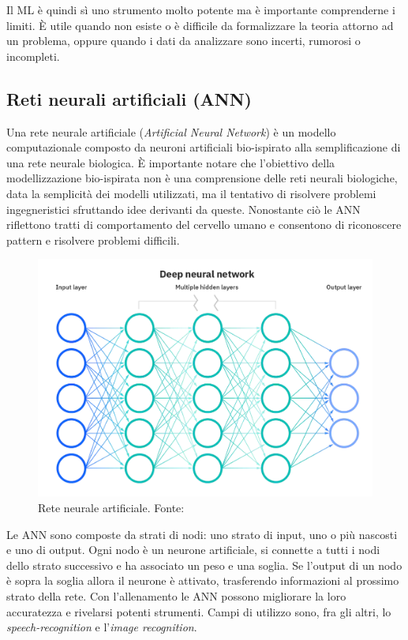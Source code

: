 Il ML è quindi sì uno strumento molto potente ma è importante comprenderne i limiti. È utile quando non esiste o è difficile da formalizzare la teoria attorno ad un problema, oppure quando i dati da analizzare sono incerti, rumorosi o incompleti.

\subsection{Reti neurali artificiali (ANN)}

Una rete neurale artificiale (\textit{Artificial Neural Network}) è un modello computazionale composto da neuroni artificiali bio-ispirato alla semplificazione di una rete neurale biologica. È importante notare che l'obiettivo della modellizzazione bio-ispirata non è una comprensione delle reti neurali biologiche, data la semplicità dei modelli utilizzati, ma il tentativo di risolvere problemi ingegneristici sfruttando idee derivanti da queste. Nonostante ciò le ANN riflettono tratti di comportamento del cervello umano e consentono di riconoscere pattern e risolvere problemi difficili.

\begin{figure}[!h]
	\centering
	\includegraphics[scale=0.2]{images/ann.png}
	\caption{Rete neurale artificiale. Fonte: \cite{neuralNetworksIBM}}
	\label{fig:rete-neurale}
\end{figure}

\par Le ANN sono composte da strati di nodi: uno strato di input, uno o più nascosti e uno di output. Ogni nodo è un neurone artificiale, si connette a tutti i nodi dello strato successivo e ha associato un peso e una soglia. Se l'output di un nodo è sopra la soglia allora il neurone è attivato, trasferendo informazioni al prossimo strato della rete. Con l'allenamento le ANN possono migliorare la loro accuratezza e rivelarsi potenti strumenti. Campi di utilizzo sono, fra gli altri, lo \textit{speech-recognition} e l'\textit{image recognition}.


